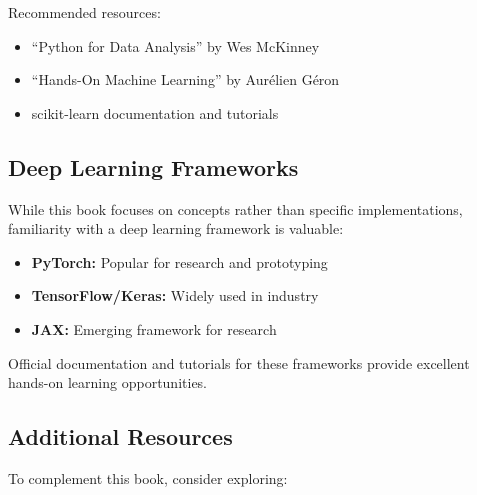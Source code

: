 Recommended resources:
\begin{itemize}
    \item ``Python for Data Analysis'' by Wes McKinney
    \item ``Hands-On Machine Learning'' by Aurélien Géron
    \item scikit-learn documentation and tutorials
\end{itemize}

\subsection{Deep Learning Frameworks}

While this book focuses on concepts rather than specific implementations, familiarity with a deep learning framework is valuable:

\begin{itemize}
    \item \textbf{PyTorch:} Popular for research and prototyping
    \item \textbf{TensorFlow/Keras:} Widely used in industry
    \item \textbf{JAX:} Emerging framework for research
\end{itemize}

Official documentation and tutorials for these frameworks provide excellent hands-on learning opportunities.

\subsection{Additional Resources}

To complement this book, consider exploring:

